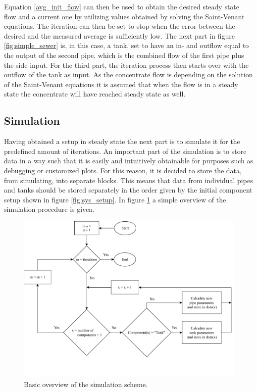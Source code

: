Equation \ref{avg_init_flow} can then be used to obtain the desired steady state flow and a current one by utilizing values obtained by solving the Saint-Venant equations. The iteration can then be set to stop when the error between the desired and the measured average is sufficiently low. The next part in figure \ref {fig:simple_sewer} is, in this case, a tank, set to have an in- and outflow equal to the output of the second pipe, which is the combined flow of the first pipe plus the side input. For the third part, the iteration process then starts over with the outflow of the tank as input.
As the concentrate flow is depending on the solution of the Saint-Venant equations it is assumed that when the flow is in a steady state the concentrate will have reached steady state as well.

\subsection*{Simulation}

Having obtained a setup in steady state the next part is to simulate it for the predefined amount of iterations. An important part of the simulation is to store data in a way such that it is easily and intuitively obtainable for purposes such as debugging or customized plots. For this reason, it is decided to store the data, from simulating, into separate blocks. This means that data from individual pipes and tanks should be stored separately in the order given by the initial component setup shown in figure \ref{fig:sys_setup}. In figure \ref{fig:simple_simulation} a simple overview of the simulation procedure is given.   

\begin{figure}[H]
\centering
\includegraphics[width=1 \textwidth]{report/simulation/pictures/simple_simulation.pdf}
\caption{Basic overview of the simulation scheme.}
\label{fig:simple_simulation}
\end{figure}


